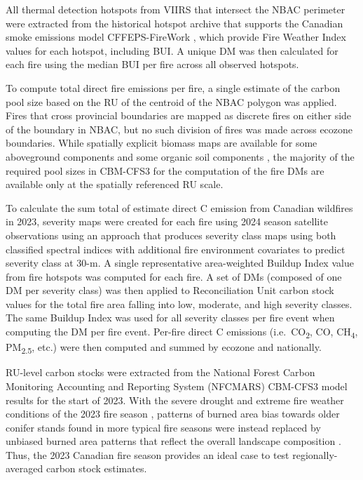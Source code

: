 \documentclass[, manuscript]{copernicus}
\begin{document}
All thermal detection hotspots from VIIRS that intersect the NBAC
perimeter were extracted from the historical hotspot archive that
supports the Canadian smoke emissions model CFFEPS-FireWork
\citep{chen2019}, which provide Fire Weather Index values for each
hotspot, including BUI. A unique DM was then calculated for each fire
using the median BUI per fire across all observed hotspots.

To compute total direct fire emissions per fire, a single estimate of
the carbon pool size based on the RU of the centroid of the NBAC polygon
was applied. Fires that cross provincial boundaries are mapped as
discrete fires on either side of the boundary in NBAC, but no such
division of fires was made across ecozone boundaries. While spatially
explicit biomass maps are available for some aboveground components
\citep{guindon2024} and some organic soil components \citep{hanes2022},
the majority of the required pool sizes in CBM-CFS3 for the computation
of the fire DMs are available only at the spatially referenced RU scale.

To calculate the sum total of estimate direct C emission from Canadian
wildfires in 2023, severity maps were created for each fire using 2024
season satellite observations using an approach that produces severity
class maps using both classified spectral indices \citep{whitman2020}
with additional fire environment covariates to predict severity class at
30-m. A single representative area-weighted Buildup Index value from
fire hotspots was computed for each fire. A set of DMs (composed of one
DM per severity class) was then applied to Reconciliation Unit carbon
stock values for the total fire area falling into low, moderate, and
high severity classes. The same Buildup Index was used for all severity
classes per fire event when computing the DM per fire event. Per-fire
direct C emissions (i.e.~CO\textsubscript{2}, CO, CH\textsubscript{4},
PM\textsubscript{2.5}, etc.) were then computed and summed by ecozone
and nationally.

RU-level carbon stocks were extracted from the National Forest Carbon
Monitoring Accounting and Reporting System (NFCMARS) CBM-CFS3 model
results for the start of 2023. With the severe drought and extreme fire
weather conditions of the 2023 fire season
\citep{jainDriversImpactsRecordBreaking2024}, patterns of burned area
bias towards older conifer stands found in more typical fire seasons
were instead replaced by unbiased burned area patterns that reflect the
overall landscape composition \citep{boulanger2024}. Thus, the 2023
Canadian fire season provides an ideal case to test regionally-averaged
carbon stock estimates.
\end{document}
